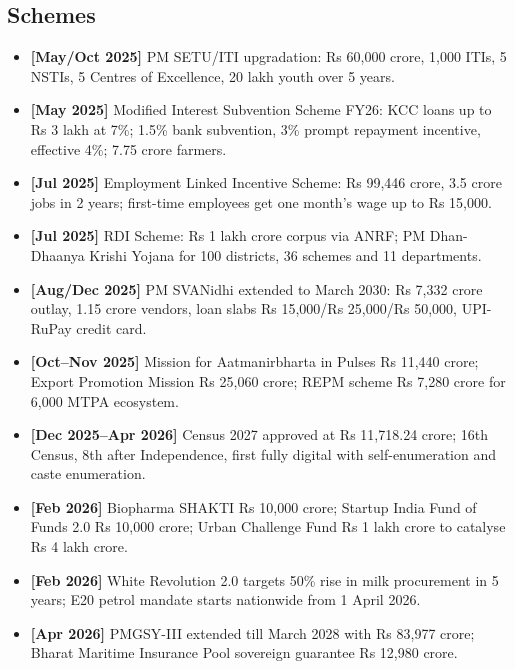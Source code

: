 \documentclass[10pt,a4paper]{article}
\newcommand{\monthtag}[1]{\textbf{[#1]}}
\newcommand{\fact}[2]{\item \monthtag{#1} #2}
\begin{document}
\subsection{Schemes}
\begin{itemize}
    \fact{May/Oct 2025}{PM SETU/ITI upgradation: Rs 60,000 crore, 1,000 ITIs, 5 NSTIs, 5 Centres of Excellence, 20 lakh youth over 5 years.}
    \fact{May 2025}{Modified Interest Subvention Scheme FY26: KCC loans up to Rs 3 lakh at 7\%; 1.5\% bank subvention, 3\% prompt repayment incentive, effective 4\%; 7.75 crore farmers.}
    \fact{Jul 2025}{Employment Linked Incentive Scheme: Rs 99,446 crore, 3.5 crore jobs in 2 years; first-time employees get one month's wage up to Rs 15,000.}
    \fact{Jul 2025}{RDI Scheme: Rs 1 lakh crore corpus via ANRF; PM Dhan-Dhaanya Krishi Yojana for 100 districts, 36 schemes and 11 departments.}
    \fact{Aug/Dec 2025}{PM SVANidhi extended to March 2030: Rs 7,332 crore outlay, 1.15 crore vendors, loan slabs Rs 15,000/Rs 25,000/Rs 50,000, UPI-RuPay credit card.}
    \fact{Oct--Nov 2025}{Mission for Aatmanirbharta in Pulses Rs 11,440 crore; Export Promotion Mission Rs 25,060 crore; REPM scheme Rs 7,280 crore for 6,000 MTPA ecosystem.}
    \fact{Dec 2025--Apr 2026}{Census 2027 approved at Rs 11,718.24 crore; 16th Census, 8th after Independence, first fully digital with self-enumeration and caste enumeration.}
    \fact{Feb 2026}{Biopharma SHAKTI Rs 10,000 crore; Startup India Fund of Funds 2.0 Rs 10,000 crore; Urban Challenge Fund Rs 1 lakh crore to catalyse Rs 4 lakh crore.}
    \fact{Feb 2026}{White Revolution 2.0 targets 50\% rise in milk procurement in 5 years; E20 petrol mandate starts nationwide from 1 April 2026.}
    \fact{Apr 2026}{PMGSY-III extended till March 2028 with Rs 83,977 crore; Bharat Maritime Insurance Pool sovereign guarantee Rs 12,980 crore.}
\end{itemize}
\end{document}
